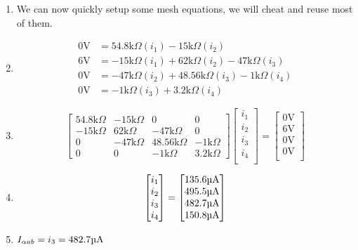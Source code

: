 \documentclass[12pt]{article}
\def\k{\mathrm{k}}
\def\V{\mathrm{V}}
\def\A{\mathrm{A}}
\def\u{\textrm{\textmu}}
\begin{document}
\begin{enumerate}
	\item We can now quickly setup some mesh equations, we will cheat and reuse most of them.
	\item \begin{align*}
		      0\V & =54.8\k\Omega(i_1)-15\k\Omega(i_2)                  \\
		      6\V & =-15\k\Omega(i_1)+62\k\Omega(i_2)-47\k\Omega(i_3)   \\
		      0\V & =-47\k\Omega(i_2)+48.56\k\Omega(i_3)-1\k\Omega(i_4) \\
		      0\V & =-1\k\Omega(i_3)+3.2\k\Omega(i_4)
	      \end{align*}
	\item \[
		      \begin{bmatrix}
			      54.8\k\Omega & -15\k\Omega & 0             & 0           \\
			      -15\k\Omega  & 62\k\Omega  & -47\k\Omega   & 0           \\
			      0            & -47\k\Omega & 48.56\k\Omega & -1\k\Omega  \\
			      0            & 0           & -1\k\Omega    & 3.2\k\Omega
		      \end{bmatrix}
		      \begin{bmatrix}
			      i_1 \\
			      i_2 \\
			      i_3 \\
			      i_4 \\
		      \end{bmatrix}
		      =
		      \begin{bmatrix}
			      0\V \\
			      6\V \\
			      0\V \\
			      0\V \\
		      \end{bmatrix}
	      \]
	\item \[
		      \begin{bmatrix}
			      i_1 \\
			      i_2 \\
			      i_3 \\
			      i_4 \\
		      \end{bmatrix}
		      =
		      \begin{bmatrix}
			      135.6\u\A \\
			      495.5\u\A \\
			      482.7\u\A \\
			      150.8\u\A \\
		      \end{bmatrix}
	      \]
	\item $I_{\alpha ab}=i_3=482.7\u\A$
\end{enumerate}
\end{document}
